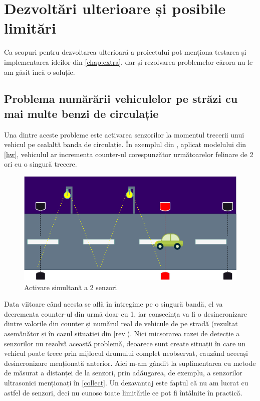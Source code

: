 \chapter{Dezvoltări ulterioare și posibile limitări}
\label{chap:next}
Ca scopuri pentru dezvoltarea ulterioară a proiectului pot menționa testarea și implementarea ideilor din \autoref{chap:extra}, dar și rezolvarea problemelor cărora nu le-am găsit încă o soluție.
\section{Problema numărării vehiculelor pe străzi cu mai multe benzi de circulație}
Una dintre aceste probleme este activarea senzorilor la momentul trecerii unui vehicul pe cealaltă banda de circulație. În exemplul din , aplicat modelului din \autoref{hw}, vehiculul ar incrementa counter-ul corespunzător următoarelor felinare de 2 ori cu o singură trecere.
 
\begin{figure}[!ht]
    \begin{center}
    \includegraphics[width=0.6\linewidth,keepaspectratio]{pics/dezv.png}
    \end{center}
    \caption{Activare simultană a 2 senzori}
    \label{fig:dezv}
\end{figure}

 Data viitoare când acesta se află în întregime pe o singură bandă, el va decrementa counter-ul din urmă doar cu 1, iar consecința va fi o desincronizare dintre valorile din counter și numărul real de vehicule de pe stradă (rezultat asemănător și în cazul situației din \autoref{rev}).  Nici micșorarea razei de detecție a senzorilor nu rezolvă această problemă, deoarece sunt create situații în care un vehicul poate trece prin mijlocul drumului complet neobservat, cauzând aceeași desincronizare menționată anterior. Aici m-am gândit la suplimentarea cu metode de măsurat a distanței de la senzori, prin adăugarea, de exemplu, a senzorilor ultrasonici menționați în \autoref{collect}. Un dezavantaj este faptul că nu am lucrat cu astfel de senzori, deci nu cunosc toate limitările ce pot fi întâlnite în practică. 

